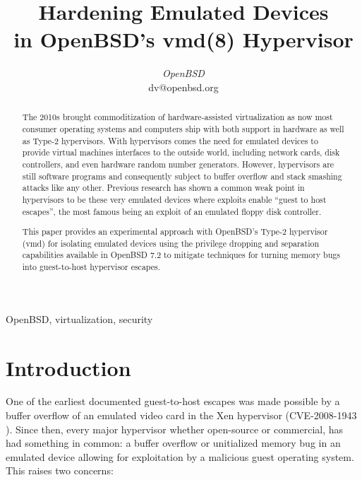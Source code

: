 \documentclass[conference]{IEEEtran}
\begin{document}
\title{Hardening Emulated Devices \\ in OpenBSD's vmd(8) Hypervisor}

\author{
\textit{OpenBSD}\\
dv@openbsd.org}

\maketitle

\begin{abstract}
The 2010s brought commoditization of hardware-assisted virtualization
as now most consumer operating systems and computers ship with both
support in hardware as well as Type-2 hypervisors. With hypervisors
comes the need for emulated devices to provide virtual machines
interfaces to the outside world, including network cards, disk
controllers, and even hardware random number generators. However,
hypervisors are still software programs and consequently subject to
buffer overflow and stack smashing attacks like any other. Previous
research has shown a common weak point in hypervisors to be these very
emulated devices where exploits enable ``guest to host escapes'', the
most famous being an exploit of an emulated floppy disk controller.

This paper provides an experimental approach with OpenBSD's Type-2
hypervisor (vmd) for isolating emulated devices using the privilege
dropping and separation capabilities available in OpenBSD 7.2 to
mitigate techniques for turning memory bugs into guest-to-host
hypervisor escapes.
\end{abstract}

\vspace{2mm}
\begin{IEEEkeywords}
OpenBSD, virtualization, security
\end{IEEEkeywords}

\vspace{5mm}
\section{Introduction}
One of the earliest documented guest-to-host escapes was made possible
by a buffer overflow of an emulated video card in the Xen hypervisor
(CVE-2008-1943 \cite{b1}). Since then, every major hypervisor whether
open-source or commercial, has had something in common: a buffer
overflow or unitialized memory bug in an emulated device allowing for
exploitation by a malicious guest operating system. This raises two
concerns:
\end{document}
